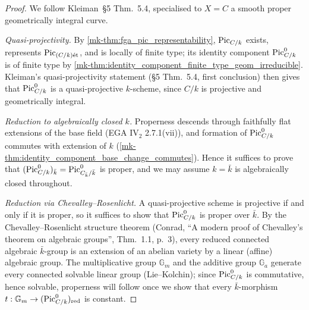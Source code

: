 \begin{proof}
  We follow Kleiman~\S 5 Thm.~5.4, specialised to \(X = C\) a
  smooth proper geometrically integral curve.

  \emph{Quasi-projectivity.} By
  \ref{mk-thm:fga_pic_representability}, \(\operatorname{Pic}_{C/k}\) exists,
  represents \(\operatorname{Pic}_{(C/k)\mathrm{\acute{e}t}}\), and is locally of finite type; its
  identity component \(\operatorname{Pic}^0_{C/k}\) is of finite type by
  \ref{mk-thm:identity_component_finite_type_geom_irreducible}.
  Kleiman's quasi-projectivity statement
  (\S 5 Thm.~5.4, first conclusion) then gives that
  \(\operatorname{Pic}^0_{C/k}\) is a quasi-projective \(k\)-scheme, since \(C/k\)
  is projective and geometrically integral.

  \emph{Reduction to algebraically closed \(k\).} Properness descends
  through faithfully flat extensions of the base field
  (EGA IV\(_2\) 2.7.1(vii)), and formation of \(\operatorname{Pic}^0_{C/k}\)
  commutes with extension of \(k\)
  (\ref{mk-thm:identity_component_base_change_commutes}). Hence it
  suffices to prove that \((\operatorname{Pic}^0_{C/k})_{\bar k} =
  \operatorname{Pic}^0_{C_{\bar k}/\bar k}\) is proper, and we may assume
  \(k = \bar k\) is algebraically closed throughout.

  \emph{Reduction via Chevalley--Rosenlicht.} A quasi-projective
  scheme is projective if and only if it is proper, so it suffices to
  show that \(\operatorname{Pic}^0_{C/k}\) is proper over \(\bar k\). By the
  Chevalley--Rosenlicht structure theorem (Conrad, ``A modern proof of
  Chevalley's theorem on algebraic groups'', Thm.~1.1, p.~3), every
  reduced connected algebraic \(\bar k\)-group is an extension of an
  abelian variety by a linear (affine) algebraic group. The
  multiplicative group \(\mathbb{G}_m\) and the additive group
  \(\mathbb{G}_a\) generate every connected solvable linear group
  (Lie--Kolchin); since \(\operatorname{Pic}^0_{C/k}\) is commutative, hence
  solvable, properness will follow once we show that every
  \(\bar k\)-morphism \(t : \mathbb{G}_m \to (\operatorname{Pic}^0_{C/k})_{\mathrm{red}}\)
  is constant.


\end{proof}
